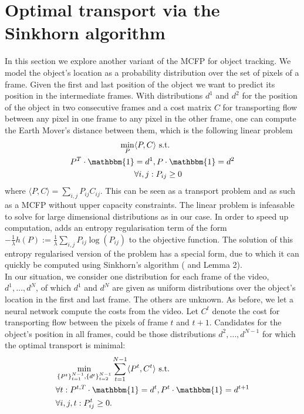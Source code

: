 \documentclass{article}
\begin{document}
\section{Optimal transport via the Sinkhorn algorithm}\label{Sinkhorn}
In this section we explore another variant of the MCFP for object tracking. We model the object's location as a probability distribution over the set of pixels of a frame. Given the first and last position of the object we want to predict its position in the intermediate frames. With distributions $d^1$ and $d^2$ for the position of the object in two consecutive frames and a cost matrix $C$ for transporting flow between any pixel in one frame to any pixel in the other frame, one can compute the Earth Mover's distance between them, which is the following linear problem
\begin{align}\label{EMD}
\min_{P} &\langle P, C \rangle \textnormal{ s.t. } \\
 P^T \cdot \mathbbm{1} &= d^1,  P\cdot \mathbbm{1} = d^2 \nonumber\\
&\forall i, j: P_{ij} \geq 0 \nonumber
\end{align}
where $\langle P, C \rangle = \sum_{i,j} P_{ij}C_{ij}$. This can be seen as a transport problem and as such as a MCFP without upper capacity constraints. The linear problem is infeasable to solve for large dimensional distributions as in our case. In order to speed up computation, \cite{Cut13} adds an entropy regularisation term of the form $-\frac{1}{\lambda}h(P) := \frac{1}{\lambda}\sum_{i,j} P_{ij}\log(P_{ij})$ to the objective function. The solution of this entropy regularised version of the problem has a special form, due to which it can quickly be computed using Sinkhorn's algorithm (\cite{Sink67} and \cite{Cut13} Lemma 2). \\
In our situation, we consider one distribution for each frame of the video, $d^1, \dots, d^N$, of which $d^1$ and $d^N$ are given as uniform distributions over the object's location in the first and last frame. The others are unknown. As before, we let a neural network compute the costs from the video. Let $C^t$ denote the cost for transporting flow between the pixels of frame $t$ and $t+1$. Candidates for the object's position in all frames, could be those distributions $d^2, \dots, d^{N-1}$ for which the optimal transport is minimal:
\begin{align}\label{EMDtrack}
&\min_{\{P^t\}_{t=1}^{N-1}, \{d^t\}_{t=2}^{N-1}} \sum_{t=1}^{N-1} \langle P^t, C^t\rangle \textnormal{ s.t. }\\
&\forall t: P^{t,T} \cdot \mathbbm{1} = d^t, P^t\cdot \mathbbm{1} = d^{t+1} \nonumber\\
&\forall i,j,t: P^t_{ij} \geq 0.\nonumber
\end{align}
\end{document}
